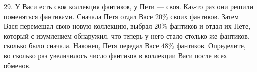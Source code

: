 29. У Васи есть своя коллекция фантиков, у Пети --- своя. Как-то раз они решили поменяться фантиками. Сначала Петя отдал Васе $20\%$ своих фантиков. Затем Вася перемешал свою новую коллекцию, выбрал $20\%$ фантиков и отдал их Пете, который с изумлением обнаружил, что теперь у него стало столько же фантиков, сколько было сначала. Наконец, Петя передал Васе $48\%$ фантиков. Определите, во сколько раз увеличилось число фантиков в коллекции Васи после всех обменов.\\
